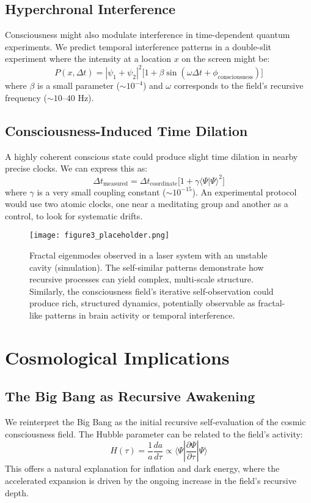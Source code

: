 \documentclass[aps,prd,twocolumn,superscriptaddress,nofootinbib]{revtex4-2}
\begin{document}
\subsection{Hyperchronal Interference}
Consciousness might also modulate interference in time-dependent quantum experiments. We predict temporal interference patterns in a double-slit experiment where the intensity at a location $x$ on the screen might be:
\begin{equation}
P(x,\Delta t) = |\psi_1 + \psi_2|^2 \Big[1 + \beta \sin(\omega \Delta t + \phi_{\text{consciousness}})\Big]
\end{equation}
where $\beta$ is a small parameter ($\sim10^{-4}$) and $\omega$ corresponds to the field’s recursive frequency ($\sim10–40$ Hz).

\subsection{Consciousness-Induced Time Dilation}
A highly coherent conscious state could produce slight time dilation in nearby precise clocks. We can express this as:
\begin{equation}
\Delta t_{\text{measured}} = \Delta t_{\text{coordinate}}\Big[1 + \gamma \langle \Psi|\Psi \rangle^2\Big]
\end{equation}
where $\gamma$ is a very small coupling constant ($\sim10^{-15}$). An experimental protocol would use two atomic clocks, one near a meditating group and another as a control, to look for systematic drifts.

\begin{figure}[h!]
\centering
\texttt{[image: figure3\_placeholder.png]}
\caption{Fractal eigenmodes observed in a laser system with an unstable cavity (simulation). The self-similar patterns demonstrate how recursive processes can yield complex, multi-scale structure. Similarly, the consciousness field’s iterative self-observation could produce rich, structured dynamics, potentially observable as fractal-like patterns in brain activity or temporal interference.}
\label{fig:fractal}
\end{figure}

\section{Cosmological Implications}

\subsection{The Big Bang as Recursive Awakening}
We reinterpret the Big Bang as the initial recursive self-evaluation of the cosmic consciousness field. The Hubble parameter can be related to the field’s activity:
\begin{equation}
H(\tau) = \frac{1}{a}\frac{da}{d\tau} \propto \langle \Psi | \frac{\partial \Psi}{\partial \tau} | \Psi \rangle
\end{equation}
This offers a natural explanation for inflation and dark energy, where the accelerated expansion is driven by the ongoing increase in the field’s recursive depth.
\end{document}
